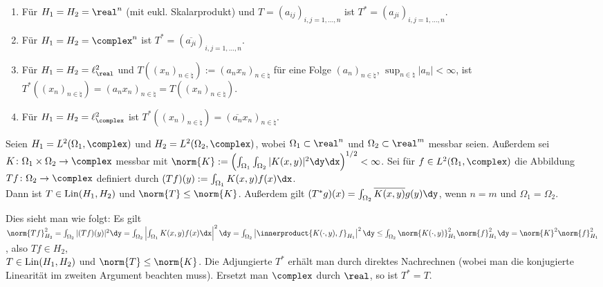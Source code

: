 \begin{Bsp}
    \begin{enumerate}[label=\emph{(\alph*)}]
        \item
        Für $H_1 = H_2 = \real^n$ (mit eukl. Skalarprodukt) und
        $T = (a_{ij})_{i,j=1,\dotsc,n}$ ist $T^\ast = (a_{ji})_{i,j=1,\dotsc,n}$.

        \item
        Für $H_1 = H_2 = \complex^n$ ist $T^\ast = (\overline{a_{ji}})_{i,j=1,\dotsc,n}$.

        \item
        Für $H_1 = H_2 = \ell^2_\real$ und
        $T((x_n)_{n \in \natural}) := (a_n x_n)_{n \in \natural}$ für eine Folge
        $(a_n)_{n \in \natural}$, $\sup_{n \in \natural} |a_n| < \infty$, ist
        $T^\ast((x_n)_{n \in \natural}) = (a_n x_n)_{n \in \natural} = T((x_n)_{n \in \natural})$.

        \item
        Für $H_1 = H_2 = \ell^2_\complex$ ist
        $T^\ast((x_n)_{n \in \natural}) = (\overline{a_n} x_n)_{n \in \natural}$.
    \end{enumerate}
\end{Bsp}

\linie

\begin{Bsp}
    Seien $H_1 = L^2(\Omega_1, \complex)$ und $H_2 = L^2(\Omega_2, \complex)$,
    wobei $\Omega_1 \subset \real^n$ und $\Omega_2 \subset \real^m$ messbar seien.
    Außerdem sei $K\colon \Omega_1 \times \Omega_2 \rightarrow \complex$ messbar
    mit $\norm{K} := \left(\int_{\Omega_1} \int_{\Omega_2}
    |K(x, y)|^2 \dy \dx\right)^{1/2} < \infty$.
    Sei für $f \in L^2(\Omega_1, \complex)$ die Abbildung $Tf\colon \Omega_2 \rightarrow \complex$
    definiert durch $(Tf)(y) := \int_{\Omega_1} K(x, y)f(x)\dx$.\\
    Dann ist $T \in \operatorname{Lin}(H_1, H_2)$ und $\norm{T} \le \norm{K}$.
    Außerdem gilt $(T^\ast g)(x) = \int_{\Omega_2} \overline{K(x, y)} g(y) \dy$,
    wenn $n = m$ und $\Omega_1 = \Omega_2$.

    Dies sieht man wie folgt:
    Es gilt $\norm{Tf}_{H_2}^2 = \int_{\Omega_2} |(Tf)(y)|^2 \dy
    = \int_{\Omega_2} \left|\int_{\Omega_1} K(x, y)f(x)\dx\right|^2 \dy\\
    = \int_{\Omega_2} \left|\innerproduct{K(\cdot, y), f}_{H_1}\right|^2 \dy
    \le \int_{\Omega_2} \norm{K(\cdot, y)}_{H_1}^2 \norm{f}_{H_1}^2 \dy
    = \norm{K}^2 \norm{f}_{H_1}^2$,
    also $Tf \in H_2$,\\
    $T \in \operatorname{Lin}(H_1, H_2)$ und $\norm{T} \le \norm{K}$.
    Die Adjungierte $T^\ast$ erhält man durch direktes Nachrechnen
    (wobei man die konjugierte Linearität im zweiten Argument beachten muss).
    Ersetzt man $\complex$ durch $\real$, so ist $T^\ast = T$.
\end{Bsp}


